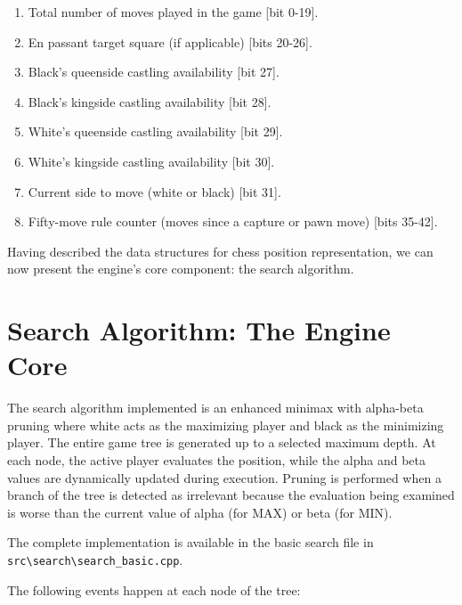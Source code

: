 \begin{enumerate}
    \item Total number of moves played in the game [bit 0-19]. 
    \item En passant target square (if applicable) [bits 20-26].
    \item Black's queenside castling availability [bit 27].
    \item Black's kingside castling availability [bit 28].
    \item White's queenside castling availability [bit 29].
    \item White's kingside castling availability [bit 30].
    \item Current side to move (white or black) [bit 31].
    \item Fifty-move rule counter (moves since a capture or pawn move) [bits 35-42].
\end{enumerate}

\vspace{1em}

\noindent Having described the data structures for chess position representation, we can now present the engine's core component: the search algorithm.

\newpage

\section{Search Algorithm: The Engine Core}

The search algorithm implemented is an enhanced minimax with alpha-beta pruning where white acts as the maximizing player and black as the minimizing player. The entire game tree is generated up to a selected maximum depth. At each node, the active player evaluates the position, while the alpha and beta values are dynamically updated during execution. Pruning is performed when a branch of the tree is detected as irrelevant because the evaluation being examined is worse than the current value of alpha (for MAX) or beta (for MIN).

\vspace{1em}

\noindent \parbox{\textwidth}{The complete implementation is available in the basic search file in \texttt{src\textbackslash{}search\textbackslash{}search\_basic.cpp}.}

\vspace{1em}

\noindent The following events happen at each node of the tree:

